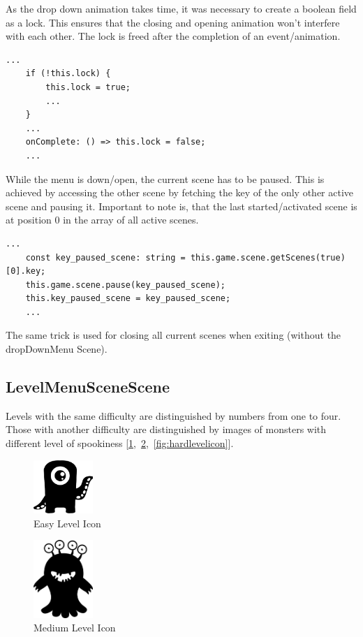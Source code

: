 As the drop down animation takes time, it was necessary to create a boolean field as a lock.
This ensures that the closing and opening animation won't interfere with each other.
The lock is freed after the completion of an event/animation.

\begin{lstlisting}[style=TypeScript, caption={Lock acquiring and freeing}]
    ...
    if (!this.lock) {
        this.lock = true;
        ...
    }
    ...
    onComplete: () => this.lock = false;
    ...
\end{lstlisting}

While the menu is down/open, the current scene has to be paused.
This is achieved by accessing the other scene by fetching the key of the only other active scene and pausing it.
Important to note is, that the last started/activated scene is at position 0 in the array of all active scenes.
\begin{lstlisting}[style=TypeScript, caption={Fetching current active scene}]
    ...
    const key_paused_scene: string = this.game.scene.getScenes(true)[0].key;
    this.game.scene.pause(key_paused_scene);
    this.key_paused_scene = key_paused_scene;
    ...
\end{lstlisting}

The same trick is used for closing all current scenes when exiting (without the dropDownMenu Scene).

\subsection{LevelMenuSceneScene}\label{subsec:levelmenuscenescene}
Levels with the same difficulty are distinguished by numbers from one to four.
Those with another difficulty are distinguished by images of monsters with different level of spookiness
[\ref{fig:easylevelicon},\ \ref{fig:mediumlevelicon},\ \ref{fig:hardlevelicon}].

\begin{figure}[H]
    \centering
    \includegraphics[width=0.2\textwidth]{figures/easylevelicon}
    \caption{Easy Level Icon}
    \label{fig:easylevelicon}
\end{figure}

\begin{figure}[H]
    \centering
    \includegraphics[width=0.2\textwidth]{figures/mediumlevelicon}
    \caption{Medium Level Icon}
    \label{fig:mediumlevelicon}
\end{figure}

